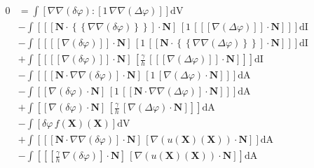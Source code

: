 \documentclass[preview,varwidth,multi,border=1pt]{standalone}
\begin{document}
\newpage

\preview
$\begin{aligned}
0 &= \int\left[\nabla\nabla\left(\delta{\varphi}\right) \colon \left[{1}\,\nabla\nabla\left(\Delta{\varphi}\right)\right]\right]\textrm{dV} \\
  &- \int\left[\left[\left[\mathbf{N} \cdot \left\lbrace\!\left\lbrace\nabla\nabla\left(\delta{\varphi}\right)\right\rbrace\!\right\rbrace\right] \cdot \mathbf{N}\right]\,\left[{1}\,\left[\left[\!\left[\nabla\left(\Delta{\varphi}\right)\right]\!\right] \cdot \mathbf{N}\right]\right]\right]\textrm{dI} \\
  &- \int\left[\left[\left[\!\left[\nabla\left(\delta{\varphi}\right)\right]\!\right] \cdot \mathbf{N}\right]\,\left[{1}\,\left[\left[\mathbf{N} \cdot \left\lbrace\!\left\lbrace\nabla\nabla\left(\Delta{\varphi}\right)\right\rbrace\!\right\rbrace\right] \cdot \mathbf{N}\right]\right]\right]\textrm{dI} \\
  &+ \int\left[\left[\left[\!\left[\nabla\left(\delta{\varphi}\right)\right]\!\right] \cdot \mathbf{N}\right]\,\left[{\frac{\gamma}{h}}\,\left[\left[\!\left[\nabla\left(\Delta{\varphi}\right)\right]\!\right] \cdot \mathbf{N}\right]\right]\right]\textrm{dI} \\
  &- \int\left[\left[\left[\mathbf{N} \cdot \nabla\nabla\left(\delta{\varphi}\right)\right] \cdot \mathbf{N}\right]\,\left[{1}\,\left[\nabla\left(\Delta{\varphi}\right) \cdot \mathbf{N}\right]\right]\right]\textrm{dA} \\
  &- \int\left[\left[\nabla\left(\delta{\varphi}\right) \cdot \mathbf{N}\right]\,\left[{1}\,\left[\left[\mathbf{N} \cdot \nabla\nabla\left(\Delta{\varphi}\right)\right] \cdot \mathbf{N}\right]\right]\right]\textrm{dA} \\
  &+ \int\left[\left[\nabla\left(\delta{\varphi}\right) \cdot \mathbf{N}\right]\,\left[{\frac{\gamma}{h}}\,\left[\nabla\left(\Delta{\varphi}\right) \cdot \mathbf{N}\right]\right]\right]\textrm{dA} \\
  &- \int\left[\delta{\varphi}\,{f\left(\mathbf{X}\right)\left(\mathbf{X}\right)}\right]\textrm{dV} \\
  &+ \int\left[\left[\left[\mathbf{N} \cdot \nabla\nabla\left(\delta{\varphi}\right)\right] \cdot \mathbf{N}\right]\,\left[\nabla\left({u\left(\mathbf{X}\right)\left(\mathbf{X}\right)}\right) \cdot \mathbf{N}\right]\right]\textrm{dA} \\
  &- \int\left[\left[\left[{\frac{\gamma}{h}}\,\nabla\left(\delta{\varphi}\right)\right] \cdot \mathbf{N}\right]\,\left[\nabla\left({u\left(\mathbf{X}\right)\left(\mathbf{X}\right)}\right) \cdot \mathbf{N}\right]\right]\textrm{dA}
\end{aligned}$
\endpreview
\end{document}
